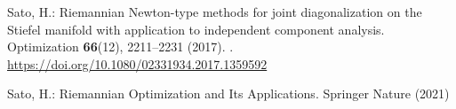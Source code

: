 \begin{thebibliography}{}
Sato, H.: Riemannian {N}ewton-type methods for joint diagonalization on the
  {S}tiefel manifold with application to independent component analysis.
\newblock Optimization \textbf{66}(12), 2211--2231 (2017).
\newblock {}.
\newblock \urlprefix\url{https://doi.org/10.1080/02331934.2017.1359592}

Sato, H.: Riemannian Optimization and Its Applications.
\newblock Springer Nature (2021)


\end{thebibliography}
%
%
%
%



